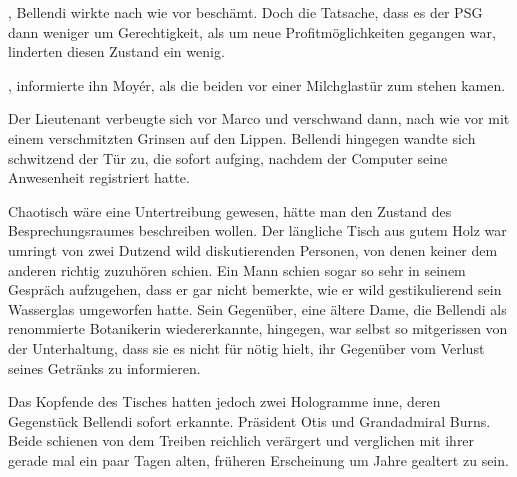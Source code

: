 \par

, Bellendi wirkte nach wie vor beschämt. Doch die Tatsache, dass es der PSG dann weniger um Gerechtigkeit, als um neue Profitmöglichkeiten gegangen war, linderten diesen Zustand ein wenig. 

\par

, informierte ihn Moyér, als die beiden vor einer Milchglastür zum stehen kamen. 

\par

Der Lieutenant verbeugte sich vor Marco und verschwand dann, nach wie vor mit einem verschmitzten Grinsen auf den Lippen. Bellendi hingegen wandte sich schwitzend der Tür zu, die sofort aufging, nachdem der Computer seine Anwesenheit registriert hatte.

\par

Chaotisch wäre eine Untertreibung gewesen, hätte man den Zustand des Besprechungsraumes beschreiben wollen. Der längliche Tisch aus gutem Holz war umringt von zwei Dutzend wild diskutierenden Personen, von denen keiner dem anderen richtig zuzuhören schien. Ein Mann schien sogar so sehr in seinem Gespräch aufzugehen, dass er gar nicht bemerkte, wie er wild gestikulierend sein Wasserglas umgeworfen hatte. Sein Gegenüber, eine ältere Dame, die Bellendi als renommierte Botanikerin wiedererkannte, hingegen, war selbst so mitgerissen von der Unterhaltung, dass sie es nicht für nötig hielt, ihr Gegenüber vom Verlust seines Getränks zu informieren.

\par

Das Kopfende des Tisches hatten jedoch zwei Hologramme inne, deren Gegenstück Bellendi sofort erkannte. Präsident Otis und Grandadmiral Burns. Beide schienen von dem Treiben reichlich verärgert und verglichen mit ihrer gerade mal ein paar Tagen alten, früheren Erscheinung um Jahre gealtert zu sein.

\par


